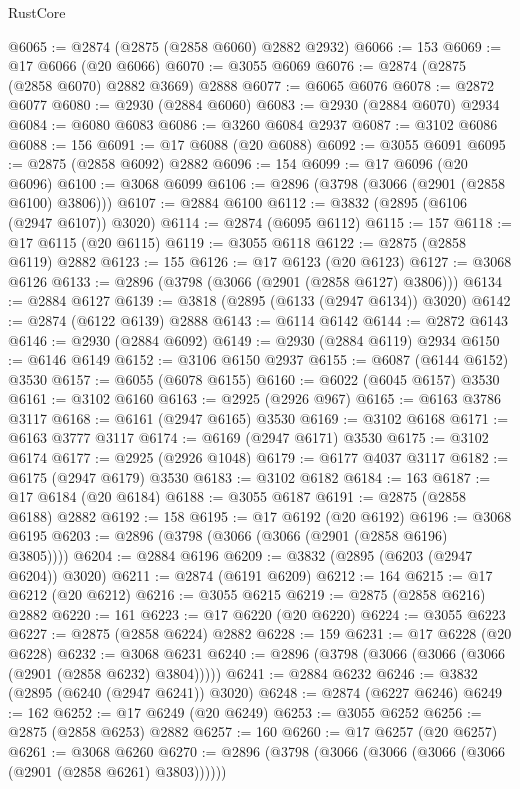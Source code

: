 \begin{lexlean}{RustCore}
\begin{coremodule}
@6065 := @2874 (@2875 (@2858 @6060) @2882 @2932)
@6066 := 153
@6069 := @17 @6066 (@20 @6066)
@6070 := @3055 @6069
@6076 := @2874 (@2875 (@2858 @6070) @2882 @3669) @2888
@6077 := @6065 @6076
@6078 := @2872 @6077
@6080 := @2930 (@2884 @6060)
@6083 := @2930 (@2884 @6070) @2934
@6084 := @6080 @6083
@6086 := @3260 @6084 @2937
@6087 := @3102 @6086
@6088 := 156
@6091 := @17 @6088 (@20 @6088)
@6092 := @3055 @6091
@6095 := @2875 (@2858 @6092) @2882
@6096 := 154
@6099 := @17 @6096 (@20 @6096)
@6100 := @3068 @6099
@6106 := @2896 (@3798 (@3066 (@2901 (@2858 @6100) @3806)))
@6107 := @2884 @6100
@6112 := @3832 (@2895 (@6106 (@2947 @6107)) @3020)
@6114 := @2874 (@6095 @6112)
@6115 := 157
@6118 := @17 @6115 (@20 @6115)
@6119 := @3055 @6118
@6122 := @2875 (@2858 @6119) @2882
@6123 := 155
@6126 := @17 @6123 (@20 @6123)
@6127 := @3068 @6126
@6133 := @2896 (@3798 (@3066 (@2901 (@2858 @6127) @3806)))
@6134 := @2884 @6127
@6139 := @3818 (@2895 (@6133 (@2947 @6134)) @3020)
@6142 := @2874 (@6122 @6139) @2888
@6143 := @6114 @6142
@6144 := @2872 @6143
@6146 := @2930 (@2884 @6092)
@6149 := @2930 (@2884 @6119) @2934
@6150 := @6146 @6149
@6152 := @3106 @6150 @2937
@6155 := @6087 (@6144 @6152) @3530
@6157 := @6055 (@6078 @6155)
@6160 := @6022 (@6045 @6157) @3530
@6161 := @3102 @6160
@6163 := @2925 (@2926 @967)
@6165 := @6163 @3786 @3117
@6168 := @6161 (@2947 @6165) @3530
@6169 := @3102 @6168
@6171 := @6163 @3777 @3117
@6174 := @6169 (@2947 @6171) @3530
@6175 := @3102 @6174
@6177 := @2925 (@2926 @1048)
@6179 := @6177 @4037 @3117
@6182 := @6175 (@2947 @6179) @3530
@6183 := @3102 @6182
@6184 := 163
@6187 := @17 @6184 (@20 @6184)
@6188 := @3055 @6187
@6191 := @2875 (@2858 @6188) @2882
@6192 := 158
@6195 := @17 @6192 (@20 @6192)
@6196 := @3068 @6195
@6203 := @2896 (@3798 (@3066 (@3066 (@2901 (@2858 @6196) @3805))))
@6204 := @2884 @6196
@6209 := @3832 (@2895 (@6203 (@2947 @6204)) @3020)
@6211 := @2874 (@6191 @6209)
@6212 := 164
@6215 := @17 @6212 (@20 @6212)
@6216 := @3055 @6215
@6219 := @2875 (@2858 @6216) @2882
@6220 := 161
@6223 := @17 @6220 (@20 @6220)
@6224 := @3055 @6223
@6227 := @2875 (@2858 @6224) @2882
@6228 := 159
@6231 := @17 @6228 (@20 @6228)
@6232 := @3068 @6231
@6240 := @2896 (@3798 (@3066 (@3066 (@3066 (@2901 (@2858 @6232) @3804)))))
@6241 := @2884 @6232
@6246 := @3832 (@2895 (@6240 (@2947 @6241)) @3020)
@6248 := @2874 (@6227 @6246)
@6249 := 162
@6252 := @17 @6249 (@20 @6249)
@6253 := @3055 @6252
@6256 := @2875 (@2858 @6253) @2882
@6257 := 160
@6260 := @17 @6257 (@20 @6257)
@6261 := @3068 @6260
@6270 := @2896 (@3798 (@3066 (@3066 (@3066 (@3066 (@2901 (@2858 @6261) @3803))))))

\end{coremodule}
\end{lexlean}
